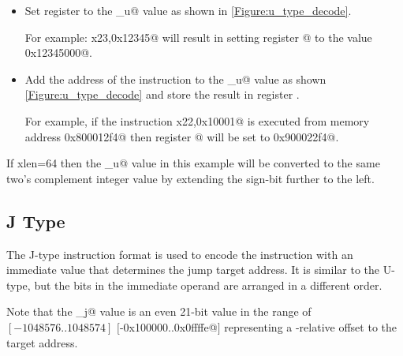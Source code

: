 \begin{itemize}
\item{}
\label{insn:lui}

Set register \verb@rd@ to the \verb@imm_u@ value as shown in \autoref{Figure:u_type_decode}.

For example: \verb@lui x23,0x12345@ will result in setting register @ to
the value \verb@0x12345000@.

\item{}
\label{insn:auipc}

Add the address of the instruction to the \verb@imm_u@ value as
shown \autoref{Figure:u_type_decode} and store the result in register \verb@rd@.

For example, if the instruction \verb@auipc x22,0x10001@ is executed from
memory address \verb@0x800012f4@ then register @ will be set to
\verb@0x900022f4@.
\end{itemize}


If \Gls{xlen}=64 then the \verb@imm_u@ value in this example will be converted
to the same two's complement integer value by extending the sign-bit
further to the left.

\subsection{J Type}
\label{insnformat:jtype}

The J-type instruction format is used to encode the \verb@jal@ instruction
with an immediate value that determines the jump target address.
It is similar to the U-type, but the bits in the immediate operand are
arranged in a different order.


Note that the \verb@imm_j@ value is
an even 21-bit value in the range of
$[-1048576..1048574]$ $[$\verb@-0x100000..0x0ffffe@$]$ representing a \verb@pc@-relative offset to the
target address.


